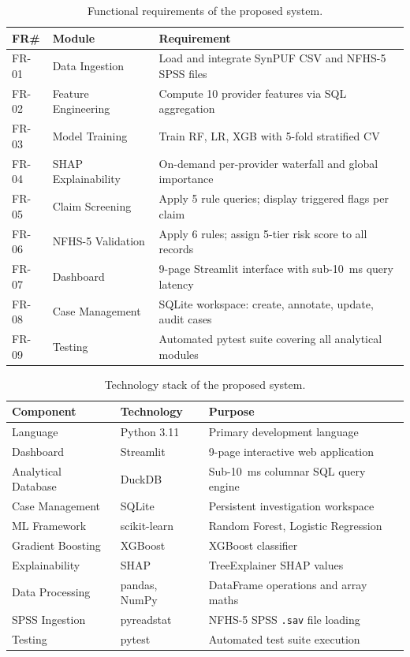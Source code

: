 \begin{table}[htbp]
\centering
\caption{Functional requirements of the proposed system.}
\label{tab:func-req}
\begin{tabular}{@{}llp{6.5cm}@{}}
\toprule
\textbf{FR\#} & \textbf{Module} & \textbf{Requirement} \\
\midrule
FR-01 & Data Ingestion      & Load and integrate SynPUF CSV and NFHS-5 SPSS files \\
FR-02 & Feature Engineering & Compute 10 provider features via SQL aggregation \\
FR-03 & Model Training      & Train RF, LR, XGB with 5-fold stratified CV \\
FR-04 & SHAP Explainability & On-demand per-provider waterfall and global importance \\
FR-05 & Claim Screening     & Apply 5 rule queries; display triggered flags per claim \\
FR-06 & NFHS-5 Validation   & Apply 6 rules; assign 5-tier risk score to all records \\
FR-07 & Dashboard           & 9-page Streamlit interface with sub-10~ms query latency \\
FR-08 & Case Management     & SQLite workspace: create, annotate, update, audit cases \\
FR-09 & Testing             & Automated pytest suite covering all analytical modules \\
\bottomrule
\end{tabular}
\end{table}

\begin{table}[htbp]
\centering
\caption{Technology stack of the proposed system.}
\label{tab:techstack}
\begin{tabular}{@{}llp{5cm}@{}}
\toprule
\textbf{Component} & \textbf{Technology} & \textbf{Purpose} \\
\midrule
Language            & Python 3.11        & Primary development language \\
Dashboard           & Streamlit          & 9-page interactive web application \\
Analytical Database & DuckDB             & Sub-10~ms columnar SQL query engine \\
Case Management     & SQLite             & Persistent investigation workspace \\
ML Framework        & scikit-learn       & Random Forest, Logistic Regression \\
Gradient Boosting   & XGBoost            & XGBoost classifier \\
Explainability      & SHAP               & TreeExplainer SHAP values \\
Data Processing     & pandas, NumPy      & DataFrame operations and array maths \\
SPSS Ingestion      & pyreadstat         & NFHS-5 SPSS \texttt{.sav} file loading \\
Testing             & pytest             & Automated test suite execution \\
\bottomrule
\end{tabular}
\end{table}

